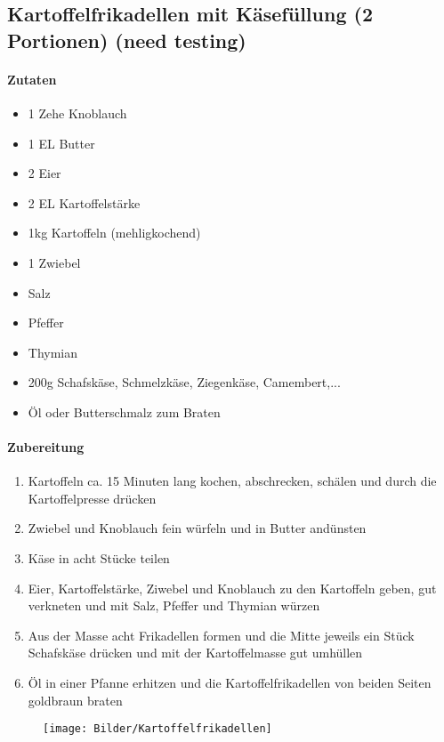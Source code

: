 \newpage
\subsection{Kartoffelfrikadellen mit Käsefüllung (2 Portionen) (need testing)}
\paragraph{Zutaten}
\begin{itemize}[noitemsep]
	\item 1 Zehe Knoblauch
	\item 1 EL Butter
	\item 2 Eier
	\item 2 EL Kartoffelstärke
	\item 1kg Kartoffeln (mehligkochend)
	\item 1 Zwiebel
	\item Salz
	\item Pfeffer
	\item Thymian
	\item 200g Schafskäse, Schmelzkäse, Ziegenkäse, Camembert,...
	\item Öl oder Butterschmalz zum Braten
\end{itemize}
\paragraph{Zubereitung}
\begin{enumerate}[noitemsep]
	\item Kartoffeln ca. 15 Minuten lang kochen, abschrecken, schälen und durch die Kartoffelpresse drücken
	\item Zwiebel und Knoblauch fein würfeln und in Butter andünsten
	\item Käse in acht Stücke teilen
	\item Eier, Kartoffelstärke, Ziwebel und Knoblauch zu den Kartoffeln geben, gut verkneten und mit Salz, Pfeffer und Thymian würzen
	\item Aus der Masse acht Frikadellen formen und die Mitte jeweils ein Stück Schafskäse drücken und mit der Kartoffelmasse gut umhüllen
	\item Öl in einer Pfanne erhitzen und die Kartoffelfrikadellen von beiden Seiten goldbraun braten
\end{enumerate}
\begin{figure}[h]
	\texttt{[image: Bilder/Kartoffelfrikadellen]}
\end{figure}